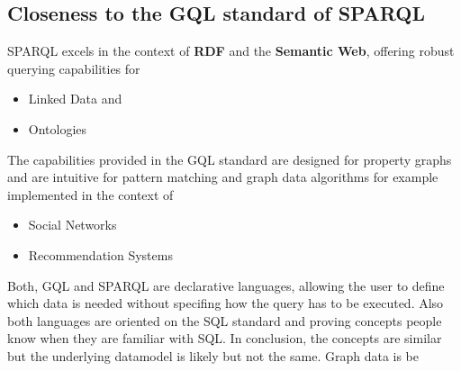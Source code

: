 \subsection{Closeness to the GQL standard of SPARQL}
SPARQL excels in the context of \textbf{RDF} and the \textbf{Semantic Web}, offering robust querying capabilities for 
\begin{itemize}
	\item Linked Data and 
	\item Ontologies
\end{itemize}
The capabilities provided in the GQL standard are designed for property graphs and are 
intuitive for pattern matching and graph data algorithms for example implemented in the context of 
\begin{itemize}
	\item Social Networks
	\item Recommendation Systems
\end{itemize}
Both, GQL and SPARQL are declarative languages, allowing the user to define which data is needed
without specifing how the query has to be executed. Also both languages are oriented on the SQL standard
and proving concepts people know when they are familiar with SQL.
In conclusion, the concepts are similar but the underlying datamodel is likely but not the same.
Graph data is be 



